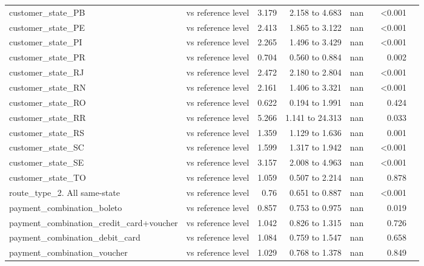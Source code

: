 \begin{table}[htbp]
\begin{tabular}{lrrrrrrr}
customer\_state\_PB & vs reference level & 3.179 & 2.158 to 4.683 & nan &  & <0.001 &  \\
customer\_state\_PE & vs reference level & 2.413 & 1.865 to 3.122 & nan &  & <0.001 &  \\
customer\_state\_PI & vs reference level & 2.265 & 1.496 to 3.429 & nan &  & <0.001 &  \\
customer\_state\_PR & vs reference level & 0.704 & 0.560 to 0.884 & nan &  & 0.002 &  \\
customer\_state\_RJ & vs reference level & 2.472 & 2.180 to 2.804 & nan &  & <0.001 &  \\
customer\_state\_RN & vs reference level & 2.161 & 1.406 to 3.321 & nan &  & <0.001 &  \\
customer\_state\_RO & vs reference level & 0.622 & 0.194 to 1.991 & nan &  & 0.424 &  \\
customer\_state\_RR & vs reference level & 5.266 & 1.141 to 24.313 & nan &  & 0.033 &  \\
customer\_state\_RS & vs reference level & 1.359 & 1.129 to 1.636 & nan &  & 0.001 &  \\
customer\_state\_SC & vs reference level & 1.599 & 1.317 to 1.942 & nan &  & <0.001 &  \\
customer\_state\_SE & vs reference level & 3.157 & 2.008 to 4.963 & nan &  & <0.001 &  \\
customer\_state\_TO & vs reference level & 1.059 & 0.507 to 2.214 & nan &  & 0.878 &  \\
route\_type\_2. All same-state & vs reference level & 0.76 & 0.651 to 0.887 & nan &  & <0.001 &  \\
payment\_combination\_boleto & vs reference level & 0.857 & 0.753 to 0.975 & nan &  & 0.019 &  \\
payment\_combination\_credit\_card+voucher & vs reference level & 1.042 & 0.826 to 1.315 & nan &  & 0.726 &  \\
payment\_combination\_debit\_card & vs reference level & 1.084 & 0.759 to 1.547 & nan &  & 0.658 &  \\
payment\_combination\_voucher & vs reference level & 1.029 & 0.768 to 1.378 & nan &  & 0.849 &  \\
\bottomrule
\end{tabular}
\par\smallskip\begin{minipage}{\linewidth}\footnotesize \end{minipage}
\end{table}

